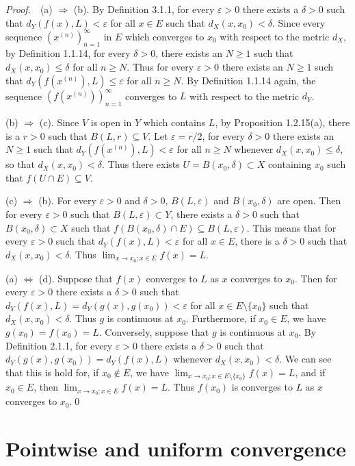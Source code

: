 \documentclass{book}
\newcommand{\pff}{\vspace{.25em}\noindent\emph{Proof.}~~}
\begin{document}
\pff (a) $\Rightarrow$ (b). By Definition 3.1.1, for every $\varepsilon>0$ there exists a $\delta>0$ such that $d_Y(f(x),L)<\varepsilon$ for all $x\in E$ such that $d_X(x,x_0)<\delta$. Since every sequence $(x^{(n)})_{n=1}^{\infty}$ in $E$ which converges to $x_0$ with respect to the metric $d_X$, by Definition 1.1.14, for every $\delta>0$, there exists an $N\geq 1$ such that $d_X(x,x_0)\leq\delta$ for all $n\geq N$. Thus for every $\varepsilon>0$ there exists an $N\geq 1$ such that $d_Y(f(x^{(n)}),L)\leq\varepsilon$ for all $n\geq N$. By Definition 1.1.14 again, the sequence $(f(x^{(n)}))_{n=1}^{\infty}$ converges to $L$ with respect to the metric $d_Y$.

(b) $\Rightarrow$ (c). Since $V$ is open in $Y$ which contains $L$, by Proposition 1.2.15(a), there is a $r>0$ such that $B(L,r)\subseteq V$. Let $\varepsilon=r/2$, for every $\delta>0$ there exists an $N\geq 1$ such that $d_Y(f(x^{(n)}),L)<\varepsilon$ for all $n\geq N$ whenever $d_X(x,x_0)\leq\delta$, so that $d_X(x,x_0)<\delta$. Thus there exists $U=B(x_0,\delta)\subset X$ containing $x_0$ such that $f(U\cap E)\subseteq V$.

(c) $\Rightarrow$ (b). For every $\varepsilon>0$ and $\delta>0$, $B(L,\varepsilon)$ and $B(x_0,\delta)$ are open. Then for every $\varepsilon>0$ such that $B(L,\varepsilon)\subset Y$, there exists a $\delta>0$ such that $B(x_0,\delta)\subset X$ such that $f(B(x_0,\delta)\cap E)\subseteq B(L,\varepsilon)$. This means that for every $\varepsilon>0$ such that $d_Y(f(x),L)<\varepsilon$ for all $x\in E$, there is a $\delta>0$ such that $d_X(x,x_0)<\delta$. Thus $\lim_{x\to x_0;x\in E}f(x)=L$.

(a) $\Leftrightarrow$ (d). Suppose that $f(x)$ converges to $L$ as $x$ converges to $x_0$. Then for every $\varepsilon>0$ there exists a $\delta>0$ such that $d_Y(f(x),L)=d_Y(g(x),g(x_0))<\varepsilon$ for all $x\in E\setminus\{x_0\}$ such that $d_X(x,x_0)<\delta$. Thus $g$ is continuous at $x_0$. Furthermore, if $x_0\in E$, we have $g(x_0)=f(x_0)=L$. Conversely, suppose that $g$ is continuous at $x_0$. By Definition 2.1.1, for every $\varepsilon>0$ there exists a $\delta>0$ such that $d_Y(g(x),g(x_0))=d_Y(f(x),L)$ whenever $d_X(x,x_0)<\delta$. We can see that this is hold for, if $x_0\notin E$, we have $\lim_{x\to x_0;x\in E\setminus\{x_0\}}f(x)=L$, and if $x_0\in E$, then $\lim_{x\to x_0;x\in E}f(x)=L$. Thus $f(x_0)$ is converges to $L$ as $x$ converges to $x_0$.\qed

\section{Pointwise and uniform convergence}
\end{document}

